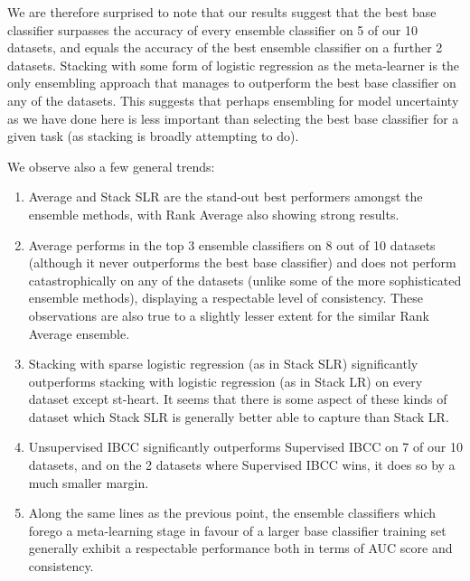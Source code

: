 \documentclass{document}
\begin{document}
We are therefore surprised to note that our results suggest that the best base classifier surpasses the accuracy of every ensemble classifier on 5 of our 10 datasets, and equals the accuracy of the best ensemble classifier on a further 2 datasets. Stacking with some form of logistic regression as the meta-learner is the only ensembling approach that manages to outperform the best base classifier on any of the datasets. This suggests that perhaps ensembling for model uncertainty as we have done here is less important than selecting the best base classifier for a given task (as stacking is broadly attempting to do).

\noindent
We observe also a few general trends:

\begin{enumerate}
\item Average and Stack SLR are the stand-out best performers amongst the ensemble methods, with Rank Average also showing strong results.
\item Average performs in the top 3 ensemble classifiers on 8 out of 10 datasets (although it never outperforms the best base classifier) and does not perform catastrophically on any of the datasets (unlike some of the more sophisticated ensemble methods), displaying a respectable level of consistency. These observations are also true to a slightly lesser extent for the similar Rank Average ensemble.
\item Stacking with sparse logistic regression (as in Stack SLR) significantly outperforms stacking with logistic regression (as in Stack LR) on every dataset except st-heart. It seems that there is some aspect of these kinds of dataset which Stack SLR is generally better able to capture than Stack LR.
\item Unsupervised IBCC significantly outperforms Supervised IBCC on 7 of our 10 datasets, and on the 2 datasets where Supervised IBCC wins, it does so by a much smaller margin.
\item Along the same lines as the previous point, the ensemble classifiers which forego a meta-learning stage in favour of a larger base classifier training set generally exhibit a respectable performance both in terms of AUC score and consistency.
\end{enumerate}
\end{document}
